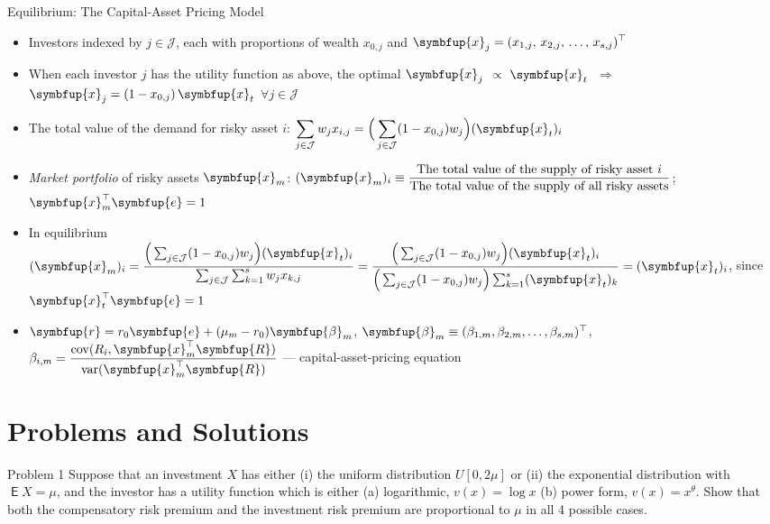 \documentclass[10pt,handout]{beamer}
\newcommand{\ds}{\displaystyle}
\newcommand{\ie}{\;\Longrightarrow\;}
\newcommand{\vx}{\symbfup{x}}
\newcommand{\vbb}{\symbfup{\beta}}
\newcommand{\vR}{\symbfup{R}}
\newcommand{\ve}{\symbfup{e}}
\newcommand{\vr}{\symbfup{r}}
\DeclareMathOperator\expc{\mathsf{E}}
\DeclareMathOperator\var{var}
\DeclareMathOperator\cov{cov}
\theoremstyle{definition}
\begin{document}
\begin{frame}{Equilibrium: The Capital-Asset Pricing Model}
  \begin{itemize}[<+->]
    \item Investors indexed by $\ds j\in\mathcal{J}$, each with proportions of wealth $x_{0, j}$ and $\ds\vx_j = (x_{1, j},\,x_{2, j},\,\ldots,\,x_{s, j})^\top$ 
    \item When each investor $j$ has the utility function as above, the optimal $\ds\vx_j$ $\propto$ $\ds\vx_t$ $\ie$ $\ds\vx_j = (1 - x_{0, j})\,\vx_t$ $\forall j\in\mathcal{J}$
    \item The total value of the demand for risky asset $i$: $\ds\sum_{j\in\mathcal{J}} w_j x_{i, j} = \Big(\sum_{j\in\mathcal{J}}(1 - x_{0, j})w_j\Big)(\vx_t)_i$ 
    \item \emph{Market portfolio} of risky assets $\vx_m$: $\ds (\vx_m)_i\equiv\frac{\text{The total value of the supply of risky asset $i$}}{\text{The total value of the supply of all risky assets}}$; $\vx^\top_m\ve = 1$
    \item In equilibrium $\ds(\vx_m)_i =  \frac{\Big(\sum_{j\in\mathcal{J}}(1 - x_{0, j})w_j\Big)(\vx_t)_i}{\sum_{j\in\mathcal{J}}\sum_{k=1}^s w_j x_{k, j}} = \frac{\Big(\sum_{j\in\mathcal{J}}(1 - x_{0, j})w_j\Big)(\vx_t)_i}{\Big(\sum_{j\in\mathcal{J}}(1 - x_{0, j})w_j\Big)\sum_{k=1}^s(\vx_t)_k} = (\vx_t)_i$, since $\vx^\top_t\ve = 1$
    \item $\vr = r_0\ve + (\mu_m - r_0)\vbb_m$, $\vbb_m\equiv(\beta_{1, m}, \beta_{2, m}, \ldots, \beta_{s, m})^\top$, $\ds\beta_{i, m} = \frac{\cov(R_i, \vx^\top_m\vR)}{\var(\vx^\top_m\vR)}$ --- capital-asset-pricing equation
  \end{itemize}
\end{frame}

\section{Problems and Solutions}

\begin{frame}{Problem 1}
  Suppose that an investment $X$ has either (i) the uniform distribution $U[0, 2\mu]$ or (ii) the exponential distribution with $\expc X = \mu$, and the investor has a utility function which is either (a) logarithmic, $v(x) = \log x$ (b) power form, $v(x) = x^\theta$. Show that both the compensatory risk premium and the investment risk premium are proportional to $\mu$ in all 4 possible cases.
\end{frame}
\end{document}
